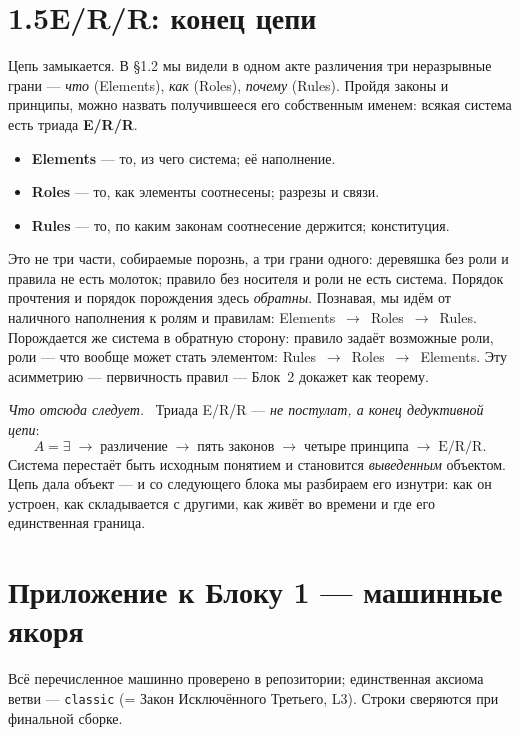 \documentclass[12pt,a4paper]{article}
\newcommand{\rezultat}{\medskip\noindent\emph{Что отсюда следует.}\ }
\begin{document}
\section*{1.5\quad E/R/R: конец цепи}

Цепь замыкается. В §1.2 мы видели в одном акте различения три неразрывные грани --- \emph{что}
(Elements), \emph{как} (Roles), \emph{почему} (Rules). Пройдя законы и принципы, можно назвать
получившееся его собственным именем: всякая система есть триада \textbf{E/R/R}.
\begin{itemize}
\item \textbf{Elements} --- то, из чего система; её наполнение.
\item \textbf{Roles} --- то, как элементы соотнесены; разрезы и связи.
\item \textbf{Rules} --- то, по каким законам соотнесение держится; конституция.
\end{itemize}

Это не три части, собираемые порознь, а три грани одного: деревяшка без роли и правила не есть
молоток; правило без носителя и роли не есть система. Порядок прочтения и порядок порождения
здесь \emph{обратны}. Познавая, мы идём от наличного наполнения к ролям и правилам:
Elements~$\to$~Roles~$\to$~Rules. Порождается же система в обратную сторону: правило задаёт
возможные роли, роли --- что вообще может стать элементом: Rules~$\to$~Roles~$\to$~Elements.
Эту асимметрию --- первичность правил --- Блок~2 докажет как теорему.

\rezultat
Триада E/R/R --- \emph{не постулат, а конец дедуктивной цепи}:
\[
  A=\exists \;\to\; \text{различение} \;\to\; \text{пять законов} \;\to\;
  \text{четыре принципа} \;\to\; \text{E/R/R}.
\]
Система перестаёт быть исходным понятием и становится \emph{выведенным} объектом. Цепь дала
объект --- и со следующего блока мы разбираем его изнутри: как он устроен, как складывается с
другими, как живёт во времени и где его единственная граница.

\appendix
\section*{Приложение к Блоку 1 — машинные якоря}
\small\raggedright\sloppy
\noindent Всё перечисленное машинно проверено в репозитории; единственная аксиома
ветви --- \texttt{classic} (= Закон Исключённого Третьего, L3). Строки сверяются при
финальной сборке.
\end{document}
